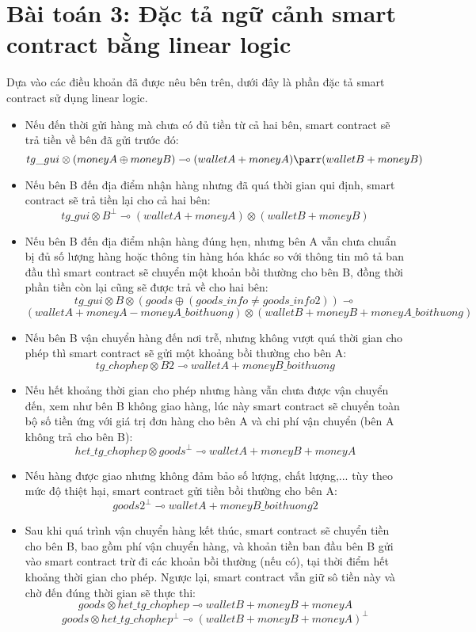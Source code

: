 \section{Bài toán 3: Đặc tả ngữ cảnh smart contract bằng linear logic}

Dựa vào các điều khoản đã được nêu bên trên, dưới đây là phần đặc tả smart contract sử dụng linear logic.


\begin{itemize}
\item Nếu đến thời gửi hàng mà chưa có đủ tiền từ cả hai bên, smart contract sẽ trả tiền về bên đã gửi trước đó:
	$$ tg\_gui \otimes (moneyA \oplus moneyB)  \multimap   (walletA + moneyA ) \parr (walletB + moneyB) $$

\item Nếu bên B đến địa điểm nhận hàng nhưng đã quá thời gian qui định,  smart contract sẽ trả tiền lại cho cả hai bên:
	$$ tg\_gui \otimes B^{\bot} \multimap (walletA + moneyA) \otimes (walletB + moneyB) $$

\item Nếu bên B đến địa điểm nhận hàng đúng hẹn, nhưng bên A vẫn chưa chuẩn bị đủ số lượng hàng  hoặc thông tin hàng hóa khác so với thông tin mô tả ban đầu thì smart contract sẽ chuyển một khoản bồi thường cho bên B, đồng thời phần tiền còn lại cũng sẽ được trả về cho hai bên:
	$$ tg\_gui \otimes B \otimes (goods \oplus (goods\_info \neq goods\_info2)) \multimap$$
    $$(walletA + moneyA - moneyA\_boithuong) \otimes (walletB + moneyB + moneyA\_boithuong)$$

\item Nếu bên B vận chuyển hàng đến nơi trễ, nhưng không vượt quá thời gian cho phép thì smart contract sẽ gửi một khoảng bồi thường cho bên A:
	$$ tg\_chophep \otimes B2 \multimap walletA + moneyB\_boithuong $$
    
\item Nếu hết khoảng thời gian cho phép nhưng hàng vẫn chưa được  vận chuyển đến, xem như bên B không giao hàng, lúc này smart contract sẽ chuyển toàn bộ số tiền ứng với giá trị đơn hàng cho bên A và chi phí vận chuyển (bên A không trả cho bên B):
	$$het\_tg\_chophep \otimes goods^{\bot} \multimap walletA + moneyB + moneyA$$
    
\item Nếu hàng  được giao nhưng không đảm bảo số lượng, chất lượng,... tùy theo mức độ thiệt hại, smart contract gửi tiền bồi thường cho bên A:
	$$goods2^{\bot} \multimap  walletA + moneyB\_boithuong2$$
    
\item Sau khi quá trình vận chuyển hàng kết thúc, smart contract sẽ chuyển tiền cho bên B, bao gồm phí vận chuyển hàng, và khoản tiền ban đầu bên B gửi vào smart contract trừ đi các khoản bồi thường (nếu có), tại thời điểm hết khoảng thời gian cho phép. Ngược lại, smart contract vẫn giữ sô tiền này và chờ đến đúng thời gian sẽ thực thi:
	$$ goods \otimes het\_tg\_chophep \multimap walletB + moneyB + moneyA $$
    $$ goods \otimes het\_tg\_chophep^{\bot} \multimap (walletB + moneyB + moneyA)^{\bot} $$
    
\end{itemize}



